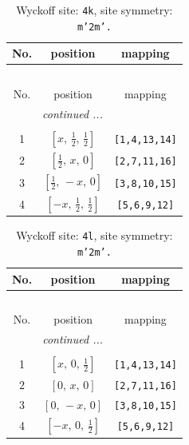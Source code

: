 \documentclass[fleqn,8pt]{jsarticle}
\begin{document}
\renewcommand{\arraystretch}{1.2}
\begin{longtable}{ccc}
\caption{Wyckoff site: {\tt 4k}, site symmetry: {\tt m'2m'.}}
 \\
 \hline \hline
No. & position & mapping \\ \hline \endfirsthead

\multicolumn{2}{l}{\tablename\ \thetable{}} \\
 \hline \hline
No. & position & mapping \\ \hline \endhead

 \hline \hline
\multicolumn{2}{r}{\footnotesize\it continued ...} \\ \endfoot

 \hline \hline
\multicolumn{2}{r}{} \\ \endlastfoot

1 & $\left[ x,\, \frac{1}{2},\, \frac{1}{2} \right]$ & {\tt [1,4,13,14]} \\ \hline
2 & $\left[ \frac{1}{2},\, x,\, 0 \right]$ & {\tt [2,7,11,16]} \\ \hline
3 & $\left[ \frac{1}{2},\, - x,\, 0 \right]$ & {\tt [3,8,10,15]} \\ \hline
4 & $\left[ - x,\, \frac{1}{2},\, \frac{1}{2} \right]$ & {\tt [5,6,9,12]} \\
\end{longtable}
\renewcommand{\arraystretch}{1.2}
\begin{longtable}{ccc}
\caption{Wyckoff site: {\tt 4l}, site symmetry: {\tt m'2m'.}}
 \\
 \hline \hline
No. & position & mapping \\ \hline \endfirsthead

\multicolumn{2}{l}{\tablename\ \thetable{}} \\
 \hline \hline
No. & position & mapping \\ \hline \endhead

 \hline \hline
\multicolumn{2}{r}{\footnotesize\it continued ...} \\ \endfoot

 \hline \hline
\multicolumn{2}{r}{} \\ \endlastfoot

1 & $\left[ x,\, 0,\, \frac{1}{2} \right]$ & {\tt [1,4,13,14]} \\ \hline
2 & $\left[ 0,\, x,\, 0 \right]$ & {\tt [2,7,11,16]} \\ \hline
3 & $\left[ 0,\, - x,\, 0 \right]$ & {\tt [3,8,10,15]} \\ \hline
4 & $\left[ - x,\, 0,\, \frac{1}{2} \right]$ & {\tt [5,6,9,12]} \\
\end{longtable}
\end{document}
